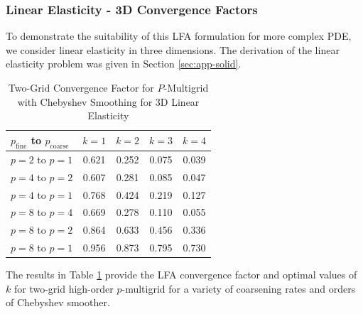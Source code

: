 \subsubsection{Linear Elasticity - 3D Convergence Factors}\label{sec:solidsresults}

To demonstrate the suitability of this LFA formulation for more complex PDE, we consider linear elasticity in three dimensions.
The derivation of the linear elasticity problem was given in Section \ref{sec:app-solid}.

\begin{table}[ht!]
\begin{center}
\begin{tabular}{l c c c c}
  \toprule
  $p_{\text{fine}}$ to $p_{\text{coarse}}$  &  $k = 1$   &  $k = 2$   &  $k = 3$   &  $k = 4$   \\
  \toprule
  $p = 2$ to $p = 1$   &  0.621  &  0.252  &  0.075  &  0.039  \\
  \midrule
  $p = 4$ to $p = 2$   &  0.607  &  0.281  &  0.085  &  0.047  \\
  $p = 4$ to $p = 1$   &  0.768  &  0.424  &  0.219  &  0.127  \\
  \midrule
  $p = 8$ to $p = 4$   &  0.669  &  0.278  &  0.110  &  0.055  \\
  $p = 8$ to $p = 2$   &  0.864  &  0.633  &  0.456  &  0.336  \\
  $p = 8$ to $p = 1$   &  0.956  &  0.873  &  0.795  &  0.730  \\
  \bottomrule
\end{tabular}
\end{center}
\caption{Two-Grid Convergence Factor for $P$-Multigrid with Chebyshev Smoothing for 3D Linear Elasticity}
\label{table:two_grid_3d_linear_elasticity}
\end{table}

The results in Table \ref{table:two_grid_3d_linear_elasticity} provide the LFA convergence factor and optimal values of $k$ for two-grid high-order $p$-multigrid for a variety of coarsening rates and orders of Chebyshev smoother.